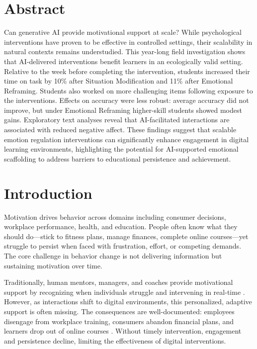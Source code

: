 \documentclass[11pt]{report}
\begin{document}
\begin{mainf}
\section{Abstract}
Can generative AI provide motivational support at scale? 
While psychological interventions have proven to be effective in controlled settings, their scalability in natural contexts remains understudied. 
This year-long field investigation shows that AI-delivered interventions benefit learners in an ecologically valid setting.
Relative to the week before completing the intervention, students increased their time on task by 10\% after Situation Modification and 11\% after Emotional Reframing. 
Students also worked on more challenging items following exposure to the interventions.
Effects on accuracy were less robust: average accuracy did not improve, but under Emotional Reframing higher-skill students showed modest gains.
Exploratory text analyses reveal that AI-facilitated interactions are associated with reduced negative affect.
These findings suggest that scalable emotion regulation interventions can significantly enhance engagement in digital learning environments, highlighting the potential for AI-supported emotional scaffolding to address barriers to educational persistence and achievement.

\section{Introduction}

Motivation drives behavior across domains including consumer decisions, workplace performance, health, and education. People often know what they should do—stick to fitness plans, manage finances, complete online courses—yet struggle to persist when faced with frustration, effort, or competing demands. The core challenge in behavior change is not delivering information but sustaining motivation over time.

Traditionally, human mentors, managers, and coaches provide motivational support by recognizing when individuals struggle and intervening in real-time \citep{lepper1993motivational}. However, as interactions shift to digital environments, this personalized, adaptive support is often missing. The consequences are well-documented: employees disengage from workplace training, consumers abandon financial plans, and learners drop out of online courses \citep{reich2019failure, milkman2021megastudy}. Without timely intervention, engagement and persistence decline, limiting the effectiveness of digital interventions.


\end{mainf}
\end{document}
